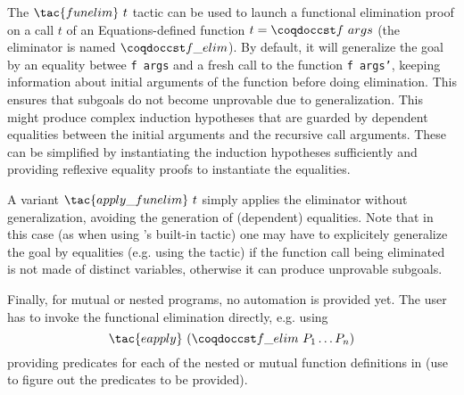 The $\tac{funelim}~t$ tactic can be used to launch a functional
elimination proof on a call $t$ of an Equations-defined function $t =
\cst{f}~args$ (the eliminator is named $\cst{f\_elim}$). By default, it will
generalize the goal by an equality betwee \texttt{f args} and a fresh
call to the function \texttt{f args'}, keeping information about initial
arguments of the function before doing elimination. This ensures that
subgoals do not become unprovable due to generalization. This might
produce complex induction hypotheses that are guarded by dependent
equalities between the initial arguments and the recursive call
arguments. These can be simplified by instantiating the induction
hypotheses sufficiently and providing reflexive equality proofs to
instantiate the equalities.

A variant $\tac{apply\_funelim}~t$ simply applies the
eliminator without generalization, avoiding the generation of
(dependent) equalities. Note that in this case (as when using \Coq's
built-in  tactic) one may have to explicitely
generalize the goal by equalities (e.g. using the 
tactic) if the function call being eliminated is not made of distinct
variables, otherwise it can produce unprovable subgoals.

Finally, for mutual or nested programs, no automation is provided yet.
The user has to invoke the functional elimination directly,
e.g. using \[\tac{eapply}~(\cst{f\_elim}~P_1 \ldots P_n)\] providing
predicates for each of the nested or mutual function definitions in
 (use   to figure out the predicates to be
provided).

